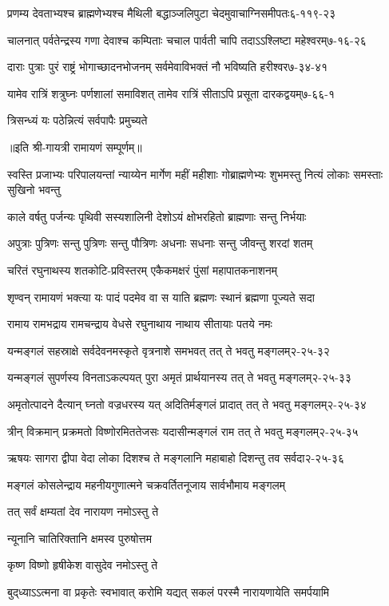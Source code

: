\annotwolineshloka
{प्रणम्य देवताभ्यश्च ब्राह्मणेभ्यश्च मैथिली}
{बद्धाञ्जलिपुटा चेदमुवाचाग्निसमीपतः}{६-११९-२३}

\annotwolineshloka
{चालनात् पर्वतेन्द्रस्य गणा देवाश्च कम्पिताः}
{चचाल पार्वती चापि तदाऽऽश्लिष्टा महेश्वरम्}{७-१६-२६}

\annotwolineshloka
{दाराः पुत्राः पुरं राष्ट्रं भोगाच्छादनभोजनम्}
{सर्वमेवाविभक्तं नौ भविष्यति हरीश्वर}{७-३४-४१}

\annotwolineshloka
{यामेव रात्रिं शत्रुघ्नः पर्णशालां समाविशत्}
{तामेव रात्रिं सीताऽपि प्रसूता दारकद्वयम्}{७-६६-१}

{त्रिसन्ध्यं यः पठेन्नित्यं सर्वपापैः प्रमुच्यते}

॥इति श्री-गायत्री रामायणं सम्पूर्णम्॥

\resetShloka
\fourlineindentedshloka
{स्वस्ति प्रजाभ्यः परिपालयन्तां}
{न्याय्येन मार्गेण महीं महीशाः}
{गोब्राह्मणेभ्यः शुभमस्तु नित्यं}
{लोकाः समस्ताः सुखिनो भवन्तु}

\twolineshloka
{काले वर्षतु पर्जन्यः पृथिवी सस्यशालिनी}
{देशोऽयं क्षोभरहितो ब्राह्मणाः सन्तु निर्भयाः}

\twolineshloka
{अपुत्राः पुत्रिणः सन्तु पुत्रिणः सन्तु पौत्रिणः}
{अधनाः सधनाः सन्तु जीवन्तु शरदां शतम्}

\twolineshloka
{चरितं रघुनाथस्य शतकोटि-प्रविस्तरम्}
{एकैकमक्षरं पुंसां महापातकनाशनम्}

\twolineshloka
{शृण्वन् रामायणं भक्त्या यः पादं पदमेव वा}
{स याति ब्रह्मणः स्थानं ब्रह्मणा पूज्यते सदा}

\twolineshloka
{रामाय रामभद्राय रामचन्द्राय वेधसे}
{रघुनाथाय नाथाय सीतायाः पतये नमः}

\annotwolineshloka
{यन्मङ्गलं सहस्राक्षे सर्वदेवनमस्कृते}
{वृत्रनाशे समभवत् तत् ते भवतु मङ्गलम्}{२-२५-३२}

\annotwolineshloka
{यन्मङ्गलं सुपर्णस्य विनताऽकल्पयत् पुरा}
{अमृतं प्रार्थयानस्य तत् ते भवतु मङ्गलम्}{२-२५-३३}

\annotwolineshloka
{अमृतोत्पादने दैत्यान् घ्नतो वज्रधरस्य यत्}
{अदितिर्मङ्गलं प्रादात् तत् ते भवतु मङ्गलम्}{२-२५-३४}

\annotwolineshloka
{त्रीन् विक्रमान् प्रक्रमतो विष्णोरमिततेजसः}
{यदासीन्मङ्गलं राम तत् ते भवतु मङ्गलम्}{२-२५-३५}

\annotwolineshloka
{ऋषयः सागरा द्वीपा वेदा लोका दिशश्च ते}
{मङ्गलानि महाबाहो दिशन्तु तव सर्वदा}{२-२५-३६}

\twolineshloka
{मङ्गलं कोसलेन्द्राय महनीयगुणात्मने}
{चक्रवर्तितनूजाय सार्वभौमाय मङ्गलम्}

{तत् सर्वं क्षम्यतां देव नारायण नमोऽस्तु ते}

{न्यूनानि चातिरिक्तानि क्षमस्व पुरुषोत्तम}

{कृष्ण विष्णो हृषीकेश वासुदेव नमोऽस्तु ते}

{बुद्‌ध्याऽऽत्मना वा प्रकृतेः स्वभावात्}
{करोमि यद्यत् सकलं परस्मै}
{नारायणायेति समर्पयामि}

